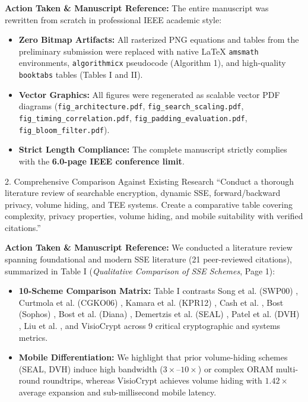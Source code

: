 \documentclass[11pt,a4paper]{article}
\begin{document}
\begin{responsebox}
\textbf{Action Taken \& Manuscript Reference:} The entire manuscript was rewritten from scratch in professional IEEE academic style:
\begin{itemize}[itemsep=2pt]
    \item \textbf{Zero Bitmap Artifacts:} All rasterized PNG equations and tables from the preliminary submission were replaced with native \LaTeX{} \texttt{amsmath} environments, \texttt{algorithmicx} pseudocode (Algorithm 1), and high-quality \texttt{booktabs} tables (Tables I and II).
    \item \textbf{Vector Graphics:} All figures were regenerated as scalable vector PDF diagrams (\texttt{fig\_architecture.pdf}, \texttt{fig\_search\_scaling.pdf}, \texttt{fig\_timing\_correlation.pdf}, \texttt{fig\_padding\_evaluation.pdf}, \texttt{fig\_bloom\_filter.pdf}).
    \item \textbf{Strict Length Compliance:} The complete manuscript strictly complies with the \textbf{6.0-page IEEE conference limit}.
\end{itemize}
\end{responsebox}

\vspace{1em}

\begin{reviewbox}{2. Comprehensive Comparison Against Existing Research}
``Conduct a thorough literature review of searchable encryption, dynamic SSE, forward/backward privacy, volume hiding, and TEE systems. Create a comparative table covering complexity, privacy properties, volume hiding, and mobile suitability with verified citations.''
\end{reviewbox}

\begin{responsebox}
\textbf{Action Taken \& Manuscript Reference:} We conducted a literature review spanning foundational and modern SSE literature (21 peer-reviewed citations), summarized in Table I (\emph{Qualitative Comparison of SSE Schemes}, Page 1):
\begin{itemize}[itemsep=2pt]
    \item \textbf{10-Scheme Comparison Matrix:} Table I contrasts Song et al. (SWP00) \cite{song2000}, Curtmola et al. (CGKO06) \cite{curtmola2006}, Kamara et al. (KPR12) \cite{kamara2012}, Cash et al. \cite{cash2013}, Bost (Sophos) \cite{bost2016sophos}, Bost et al. (Diana) \cite{bost2017diana}, Demertzis et al. (SEAL) \cite{demertzis2020seal}, Patel et al. (DVH) \cite{patel2023dvh}, Liu et al. \cite{li2021trustzone}, and VisioCrypt across 9 critical cryptographic and systems metrics.
    \item \textbf{Mobile Differentiation:} We highlight that prior volume-hiding schemes (SEAL, DVH) induce high bandwidth ($3\times$--$10\times$) or complex ORAM multi-round roundtrips, whereas VisioCrypt achieves volume hiding with $1.42\times$ average expansion and sub-millisecond mobile latency.
\end{itemize}
\end{responsebox}
\end{document}
